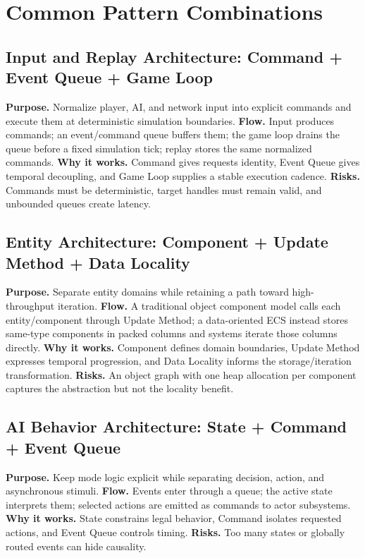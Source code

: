 \documentclass[11pt]{article}
\begin{document}
\section{Common Pattern Combinations}\label{sec:combinations}
\subsection{Input and Replay Architecture: Command + Event Queue + Game Loop}
\textbf{Purpose.} Normalize player, AI, and network input into explicit commands and execute them at deterministic simulation boundaries. \textbf{Flow.} Input produces commands; an event/command queue buffers them; the game loop drains the queue before a fixed simulation tick; replay stores the same normalized commands. \textbf{Why it works.} Command gives requests identity, Event Queue gives temporal decoupling, and Game Loop supplies a stable execution cadence. \textbf{Risks.} Commands must be deterministic, target handles must remain valid, and unbounded queues create latency.

\subsection{Entity Architecture: Component + Update Method + Data Locality}
\textbf{Purpose.} Separate entity domains while retaining a path toward high-throughput iteration. \textbf{Flow.} A traditional object component model calls each entity/component through Update Method; a data-oriented ECS instead stores same-type components in packed columns and systems iterate those columns directly. \textbf{Why it works.} Component defines domain boundaries, Update Method expresses temporal progression, and Data Locality informs the storage/iteration transformation. \textbf{Risks.} An object graph with one heap allocation per component captures the abstraction but not the locality benefit.

\subsection{AI Behavior Architecture: State + Command + Event Queue}
\textbf{Purpose.} Keep mode logic explicit while separating decision, action, and asynchronous stimuli. \textbf{Flow.} Events enter through a queue; the active state interprets them; selected actions are emitted as commands to actor subsystems. \textbf{Why it works.} State constrains legal behavior, Command isolates requested actions, and Event Queue controls timing. \textbf{Risks.} Too many states or globally routed events can hide causality.
\end{document}
